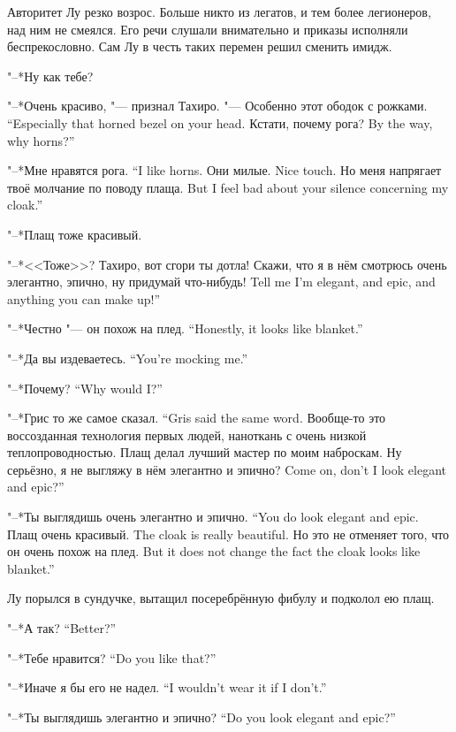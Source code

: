 Авторитет Лу резко возрос.
Больше никто из легатов, и тем более легионеров, над ним не смеялся.
Его речи слушали внимательно и приказы исполняли беспрекословно.
Сам Лу в честь таких перемен решил сменить имидж.

"--*Ну как тебе?

"--*Очень красиво, "--- признал Тахиро.
{"--- Особенно этот ободок с рожками.}
{``Especially that horned bezel on your head.}
{Кстати, почему рога?}
{By the way, why horns?''}

{"--*Мне нравятся рога.}
{``I like horns.}
{Они милые.}
{Nice touch.}
{Но меня напрягает твоё молчание по поводу плаща.}
{But I feel bad about your silence concerning my cloak.''}

"--*Плащ тоже красивый.

"--*<<Тоже>>?
Тахиро, вот сгори ты дотла!
{Скажи, что я в нём смотрюсь очень элегантно, эпично, ну придумай что-нибудь!}
{Tell me I'm elegant, and epic, and anything you can make up!''}

{"--*Честно "--- он похож на плед.}
{``Honestly, it looks like blanket.''}

{"--*Да вы издеваетесь.}
{``You're mocking me.''}

{"--*Почему?}
{``Why would I?''}

{"--*Грис то же самое сказал.}
{``Gris said the same word.}
Вообще-то это воссозданная технология первых людей, наноткань с очень низкой теплопроводностью.
Плащ делал лучший мастер по моим наброскам.
{Ну серьёзно, я не выгляжу в нём элегантно и эпично?}
{Come on, don't I look elegant and epic?''}

{"--*Ты выглядишь очень элегантно и эпично.}
{``You do look elegant and epic.}
{Плащ очень красивый.}
{The cloak is really beautiful.}
{Но это не отменяет того, что он очень похож на плед.}
{But it does not change the fact the cloak looks like blanket.''}

Лу порылся в сундучке, вытащил посеребрённую фибулу и подколол ею плащ.

{"--*А так?}
{``Better?''}

{"--*Тебе нравится?}
{``Do you like that?''}

{"--*Иначе я бы его не надел.}
{``I wouldn't wear it if I don't.''}

{"--*Ты выглядишь элегантно и эпично?}
{``Do you look elegant and epic?''}

